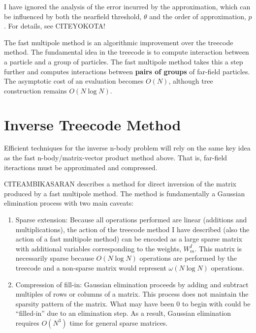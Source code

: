 \documentclass[10pt]{article}
\begin{document}
I have ignored the analysis of the error incurred by the approximation, which can be influenced by both the nearfield threshold, $\theta$ and the order of approximation, $p$. For details, see CITEYOKOTA!

The fast multipole method is an algorithmic improvement over the treecode method. The fundamental idea in the treecode is to compute interaction between a particle and a group of particles. The fast multipole method takes this a step further and computes interactions between \textbf{pairs of groups} of far-field particles. The asymptotic cost of an evaluation becomes $O(N)$, although tree construction remains $O(N\log{N})$. 

\section*{Inverse Treecode Method}

Efficient techniques for the inverse n-body problem will rely on the same key idea as the fast n-body/matrix-vector product method above. That is, far-field iteractions must be approximated and compressed.

CITEAMBIKASARAN describes a method for direct inversion of the matrix produced by a fast multipole method. The method is fundamentally a Gaussian elimination process with two main caveats:
\begin{enumerate}
    \item Sparse extension: Because all operations performed are linear (additions and multiplications), the action of the treecode method I have described (also the action of a fast multipole method) can be encoded as a large sparse matrix with additional variables corresponding to the weights, $W_m^I$. This matrix is necessarily sparse because $O(N\log{N})$ operations are performed by the treecode and a non-sparse matrix would represent $\omega(N\log{N})$ operations.
    \item Compression of fill-in: Gaussian elimination proceeds by adding and subtract multiples of rows or columns of a matrix. This process does not maintain the sparsity pattern of the matrix. What may have been 0 to begin with could be ``filled-in'' due to an elimination step. As a result, Gaussian elimination requires $O(N^3)$ time for general sparse matrices.
\end{enumerate}
\end{document}
